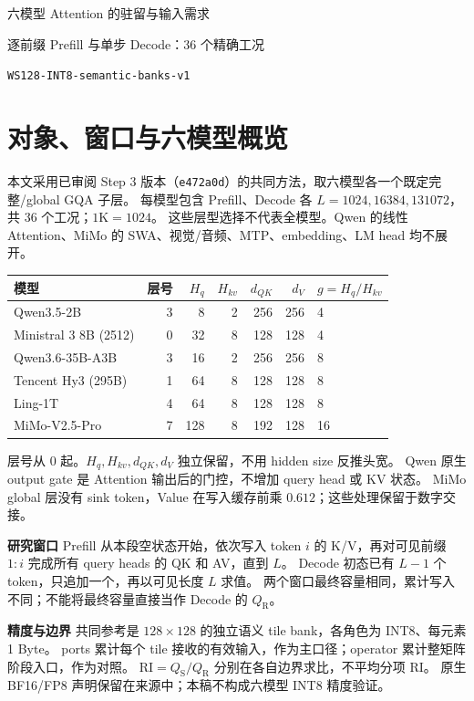 \documentclass[UTF8,a4paper,11pt]{ctexart}
\newcommand{\qs}{{Q_{\mathrm S}}}\newcommand{\qr}{{Q_{\mathrm R}}}\newcommand{\ri}{\mathrm{RI}}
\newcommand{\para}[1]{\par\textbf{#1}\quad}
\begin{document}
\begin{center}{\LARGE 六模型 Attention 的驻留与输入需求}\par\vspace{3mm}
{\large 逐前缀 Prefill 与单步 Decode：36 个精确工况}\par
\texttt{WS128-INT8-semantic-banks-v1}\end{center}
\section{对象、窗口与六模型概览}
本文采用已审阅 Step 3 版本（\texttt{e472a0d}）的共同方法，取六模型各一个既定完整/global GQA 子层。
每模型包含 Prefill、Decode 各 $L=1024,16384,131072$，共 36 个工况；$1\mathrm K=1024$。
这些层型选择不代表全模型。Qwen 的线性 Attention、MiMo 的 SWA、视觉/音频、MTP、embedding、LM head 均不展开。

\begin{center}\small
\begin{tabular}{@{}lrrrrrl@{}}\toprule
模型 & 层号 & $H_q$ & $H_{kv}$ & $d_{QK}$ & $d_V$ & $g=H_q/H_{kv}$\\\midrule
Qwen3.5-2B & 3 & 8 & 2 & 256 & 256 & 4\\
Ministral 3 8B (2512) & 0 & 32 & 8 & 128 & 128 & 4\\
Qwen3.6-35B-A3B & 3 & 16 & 2 & 256 & 256 & 8\\
Tencent Hy3 (295B) & 1 & 64 & 8 & 128 & 128 & 8\\
Ling-1T & 4 & 64 & 8 & 128 & 128 & 8\\
MiMo-V2.5-Pro & 7 & 128 & 8 & 192 & 128 & 16\\\bottomrule
\end{tabular}\end{center}
层号从 0 起。$H_q,H_{kv},d_{QK},d_V$ 独立保留，不用 hidden size 反推头宽。
Qwen 原生 output gate 是 Attention 输出后的门控，不增加 query head 或 KV 状态。
MiMo global 层没有 sink token，Value 在写入缓存前乘 $0.612$；这些处理保留于数字交接。

\para{研究窗口} Prefill 从本段空状态开始，依次写入 token $i$ 的 K/V，再对可见前缀 $1{:}i$ 完成所有 query heads 的 QK 和 AV，直到 $L$。
Decode 初态已有 $L-1$ 个 token，只追加一个，再以可见长度 $L$ 求值。
两个窗口最终容量相同，累计写入不同；不能将最终容量直接当作 Decode 的 $\qr$。

\para{精度与边界} 共同参考是 $128\times128$ 的独立语义 tile bank，各角色为 INT8、每元素 1 Byte。
ports 累计每个 tile 接收的有效输入，作为主口径；operator 累计整矩阵阶段入口，作为对照。
$\ri=\qs/\qr$ 分别在各自边界求比，不平均分项 RI。
原生 BF16/FP8 声明保留在来源中；本稿不构成六模型 INT8 精度验证。
\end{document}
